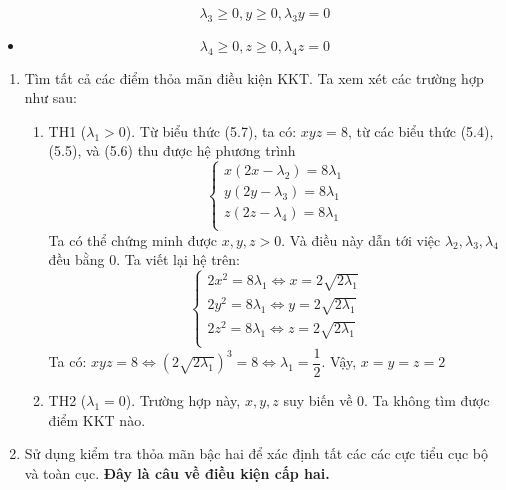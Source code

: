 \begin{solution}
\begin{itemize}
\begin{equation}
            \lambda_3 \geq 0, y \geq 0, \lambda_3y = 0
        \end{equation}
        \item \begin{equation}
            \lambda_4 \geq 0, z \geq 0, \lambda_4z = 0
        \end{equation}
    \end{itemize}
    \begin{enumerate}[label=(\alph*)]
        \item Tìm tất cả các điểm thỏa mãn điều kiện KKT. Ta xem xét các trường hợp như sau:
        \begin{enumerate}[label=(\roman*)]
            \item TH1 ($\lambda_1 > 0$). Từ biểu thức (5.7), ta có: $xyz = 8$, từ các biểu thức (5.4), (5.5), và (5.6) thu được hệ phương trình
            \begin{equation}
                \begin{cases}
                    x(2x - \lambda_2) = 8\lambda_1\\
                    y(2y - \lambda_3) = 8\lambda_1\\
                    z(2z - \lambda_4) = 8\lambda_1\\
                \end{cases}
            \end{equation}
            Ta có thể chứng minh được $x, y, z >0$. Và điều này dẫn tới việc $\lambda_2, \lambda_3, \lambda_4$ đều bằng 0. Ta viết lại hệ trên:
            \begin{equation}
                \begin{cases}
                    2x^2 = 8\lambda_1 \Leftrightarrow x = 2\sqrt{2\lambda_1}\\
                    2y^2 = 8\lambda_1 \Leftrightarrow y = 2\sqrt{2\lambda_1}\\
                    2z^2 = 8\lambda_1 \Leftrightarrow z = 2\sqrt{2\lambda_1}\\
                \end{cases}
            \end{equation}
            Ta có: $xyz = 8 \Leftrightarrow \left(2\sqrt{2\lambda_1}\right)^3 = 8 \Leftrightarrow \lambda_1 = \dfrac{1}{2}$.
            Vậy, $ x = y = z = 2$
            \item TH2 ($\lambda_1 = 0$). Trường hợp này, $x,y,z$ suy biến về 0. Ta không tìm được điểm KKT nào.
        \end{enumerate}
        \item Sử dụng kiểm tra thỏa mãn bậc hai để xác định tất các các cực tiểu cục bộ và toàn cục. \textbf{Đây là câu về điều kiện cấp hai.}
    \end{enumerate}
\end{solution}